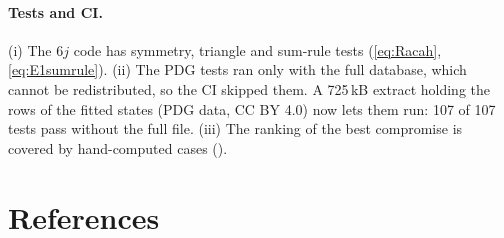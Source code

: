 \documentclass[11pt,a4paper]{article}
\numberwithin{equation}{section}
\theoremstyle{definition}
\theoremstyle{plain}
\theoremstyle{remark}
\numberwithin{algorithm}{section}
\begin{document}
\paragraph{Tests and CI.} (i) The $6j$ code has symmetry, triangle and sum-rule tests (\eqref{eq:Racah}, \eqref{eq:E1sumrule}). (ii) The PDG tests ran only with the full database, which cannot be redistributed, so the CI skipped them. A 725\,kB extract holding the rows of the fitted states (PDG data, CC BY 4.0) now lets them run: 107 of 107 tests pass without the full file. (iii) The ranking of the best compromise is covered by hand-computed cases ().

\section*{References}
\end{document}
